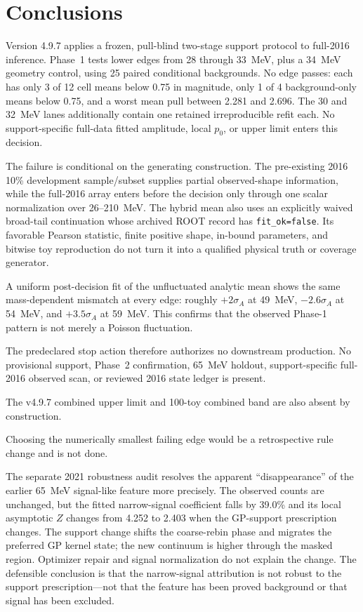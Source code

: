 \section{Conclusions}
\label{sec:conclusions}

Version 4.9.7 applies a frozen, pull-blind two-stage support protocol to
full-2016 inference.  Phase~1 tests lower edges from 28 through 33~MeV, plus a
34~MeV geometry control, using 25 paired conditional backgrounds.  No edge passes:
each has only 3 of 12 cell means below 0.75 in magnitude, only 1 of 4
background-only means below 0.75, and a worst mean pull between 2.281 and 2.696.
The 30 and 32~MeV lanes additionally contain one retained irreproducible refit each.
No support-specific full-data fitted amplitude, local $p_0$, or upper limit enters
this decision.

The failure is conditional on the generating construction.  The pre-existing 2016
10\% development sample/subset supplies partial observed-shape information, while
the full-2016 array enters before the decision only through one scalar normalization
over 26--210~MeV.  The hybrid mean also uses an explicitly waived broad-tail
continuation whose archived ROOT record has \texttt{fit\_ok=false}.  Its favorable
Pearson statistic, finite positive shape, in-bound parameters, and bitwise toy
reproduction do not turn it into a qualified physical truth or coverage generator.

A uniform post-decision fit of the unfluctuated analytic mean shows the same
mass-dependent mismatch at every edge: roughly $+2\sigma_A$ at 49~MeV,
$-2.6\sigma_A$ at 54~MeV, and $+3.5\sigma_A$ at 59~MeV.  This confirms that the
observed Phase-1 pattern is not merely a Poisson fluctuation.

\begin{samepage}
The predeclared stop action therefore authorizes no downstream production.  No
provisional support, Phase~2 confirmation, 65~MeV holdout, support-specific full-2016
observed scan, or reviewed 2016 state ledger is present.

\noindent\parbox{\linewidth}{The v4.9.7 combined upper limit and 100-toy combined
band are also absent by construction.}  Choosing the
numerically smallest failing edge would be a retrospective rule change and is not
done.
\end{samepage}

The separate 2021 robustness audit resolves the apparent ``disappearance'' of the
earlier 65~MeV signal-like feature more precisely.  The observed counts are unchanged,
but the fitted narrow-signal coefficient falls by 39.0\% and its local asymptotic
$Z$ changes from 4.252 to 2.403 when the GP-support prescription changes.  The support
change shifts the coarse-rebin phase and migrates the preferred GP kernel state; the
new continuum is higher through the masked region.  Optimizer repair and signal
normalization do not explain the change.  The defensible conclusion is that the
narrow-signal attribution is not robust to the support prescription---not that the
feature has been proved background or that signal has been excluded.

